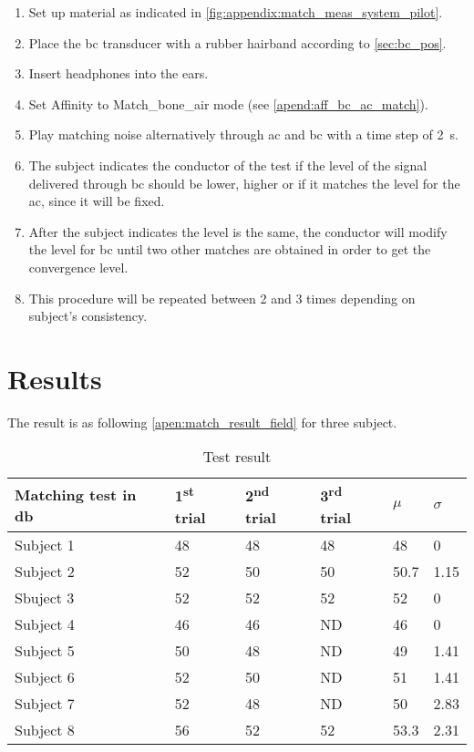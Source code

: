 \begin{enumerate}
\item Set up material as indicated in \autoref{fig:appendix:match_meas_system_pilot}.
\item Place the \gls{bc} transducer with a rubber hairband according to \autoref{sec:bc_pos}.
\item Insert headphones into the ears.
\item Set Affinity to Match_bone_air mode (see \autoref{apend:aff_bc_ac_match}).
\item Play matching noise alternatively through \gls{ac} and \gls{bc} with a time step of \SI{2}{\second}.
\item The  subject indicates the conductor of the test if the level of the signal delivered through \gls{bc} should be lower, higher or if it matches the level for the \gls{ac}, since it will be fixed.
\item After the subject indicates the level is the same, the conductor will modify the level for \gls{bc} until two other matches are obtained in order to get the convergence level.
\item This procedure will be repeated between 2 and 3 times depending on subject's consistency.
\end{enumerate}

\section*{Results}

The result is as following \autoref{apen:match_result_field} for three subject. 

\begin{table}[H]
\centering
\caption{Test result}
\begin{tabular}{l|lll|ll}
Matching test in \si{\decibel}   & 1\textsuperscript{st} trial & 2\textsuperscript{nd} trial & 3\textsuperscript{rd} trial & $\mu$ & $\sigma$ \\ \hline
Subject 1  & 48          & 48           & 48          & 48          & 0                  \\
Subject 2  & 52          & 50           & 50          & 50.7        & 1.15               \\
Sbuject 3  & 52          & 52           & 52          & 52          & 0                  \\
Subject 4  & 46          & 46           & ND          & 46          & 0                  \\
Subject 5  & 50          & 48           & ND          & 49          & 1.41               \\
Subject 6  & 52          & 50           & ND          & 51          & 1.41               \\
Subject 7  & 52          & 48           & ND          & 50          & 2.83               \\
Subject 8  & 56          & 52           & 52          & 53.3        & 2.31             
\end{tabular}
\label{apen:match_result_field}
\end{table}

